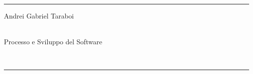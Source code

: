 \documentclass[a4paper]{article}
\begin{document}

\fancyhead[C]{}
\hrule \medskip %
\begin{minipage}{0.295\textwidth} 
\raggedright
\footnotesize
Andrei Gabriel Taraboi \hfill\\   
\hfill\\
\end{minipage}
\begin{minipage}{0.4\textwidth} 
\centering 
\large 
Processo e Sviluppo del Software\\ 
\normalsize 
\end{minipage}
\begin{minipage}{0.295\textwidth} 
\raggedleft
\hfill\\
\end{minipage}
\medskip\hrule 
\bigskip

\tableofcontents
\newpage 











\end{document}
